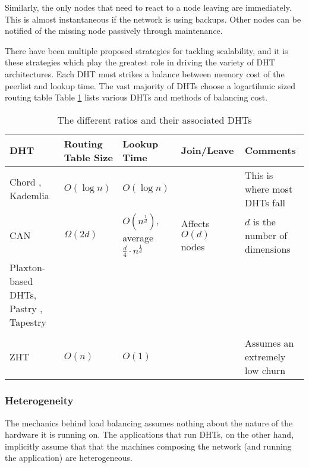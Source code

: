 \documentclass[10pt,letterpaper]{report}
\begin{document}
Similarly, the only nodes that need to react to a node leaving are immediately.
This is almost instantaneous if the network is using backups.
Other nodes can be notified of the missing node passively through maintenance.

There have been multiple proposed strategies for tackling scalability, and it is these strategies which play the greatest role in driving the variety of DHT architectures. 
Each DHT must strikes a balance between memory cost of the peerlist and lookup time. 
The vast majority of DHTs choose a logartihmic sized routing table
Table \ref{tab:tradeoffs} lists various DHTs and methods of balancing cost.


\begin{table}[h]
	\small
    \centering
    \begin{tabularx}{\textwidth}{ |X|X|X|X|X| }
    \hline
    DHT & Routing Table Size & Lookup Time & Join/Leave & Comments \\ \hline  
    Chord \cite{chord}, Kademlia \cite{kademlia} & $O(\log n)$ & $O(\log n)$ & & This is where most DHTs fall  \\ \hline
    CAN \cite{can} & $\Omega(2d)$ & $O(n^{\frac{1}{d}})$, average $\frac{d}{4}\cdot n^{\frac{1}{d}}$ & Affects $O(d)$ nodes & $d$ is the number of dimensions \\ \hline
    
    Plaxton-based DHTs, Pastry \cite{pastry}, Tapestry \cite{tapestry} &  & & & \\ \hline
    & & & & \\ \hline  
    ZHT \cite{li2013zht}&   $O(n)$& $O(1)$ &  &Assumes an extremely low churn \\ \hline
    \end{tabularx}
    \caption{The different ratios and their associated DHTs}
    \label{tab:tradeoffs}
\end{table}

\subsubsection{Heterogeneity}
The mechanics behind load balancing assumes nothing about the nature of the hardware it is running on.
The applications that run DHTs, on the other hand, implicitly assume that that the machines composing the network (and running the application) are heterogeneous.
\end{document}
